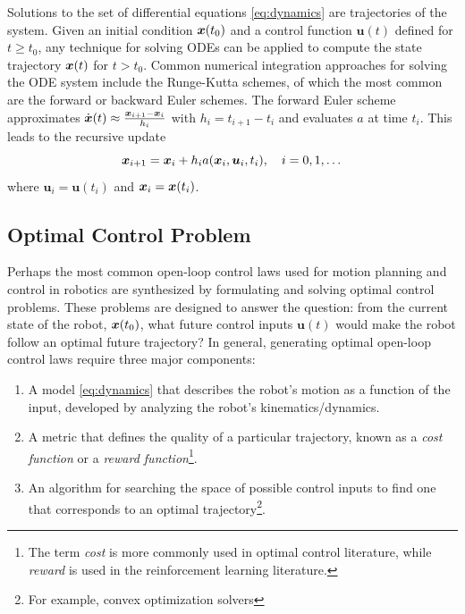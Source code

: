 Solutions to the set of differential equations \eqref{eq:dynamics} are trajectories of the system. Given an initial condition $\bm{x}(t_0)$ and a control function $\bm{u}(t)$ defined for $t \geq t_0$, any technique for solving ODEs can be applied to compute the state trajectory $\bm{x}(t)$ for $t > t_0$. Common numerical integration approaches for solving the ODE system include the Runge-Kutta schemes, of which the most common are the forward or backward Euler schemes. The forward Euler scheme approximates $\dot{\bm{x}}(t) \approx \frac{\bm{x}_{i+1} - \bm{x}_i}{h_i}$ with $h_i = t_{i+1} - t_{i}$ and evaluates $a$ at time $t_i$. This leads to the recursive update
\begin{equation}
\bm{x}_{i+1} = \bm{x}_{i} + h_i a(\bm{x}_i,\bm{u}_i,t_i), \quad i = 0, 1,\dots
\end{equation}
where $\bm{u}_i = \bm{u}(t_i)$ and $\bm{x}_i = \bm{x}(t_i)$.


\subsection{Optimal Control Problem}
Perhaps the most common open-loop control laws used for motion planning and control in robotics are synthesized by formulating and solving optimal control problems. These problems are designed to answer the question: from the current state of the robot, $\bm{x}(t_0)$, what future control inputs $\bm{u}(t)$ would make the robot follow an optimal future trajectory? In general, generating optimal open-loop control laws require three major components:
\begin{enumerate}
    \item A model \eqref{eq:dynamics} that describes the robot's motion as a function of the input, developed by analyzing the robot's kinematics/dynamics.
    \item A metric that defines the quality of a particular trajectory, known as a \textit{cost function} or a \textit{reward function}\footnote{The term \textit{cost} is more commonly used in optimal control literature, while \textit{reward} is used in the reinforcement learning literature.}.
    \item An algorithm for searching the space of possible control inputs to find one that corresponds to an optimal trajectory\footnote[][\baselineskip]{For example, convex optimization solvers}.
\end{enumerate}



